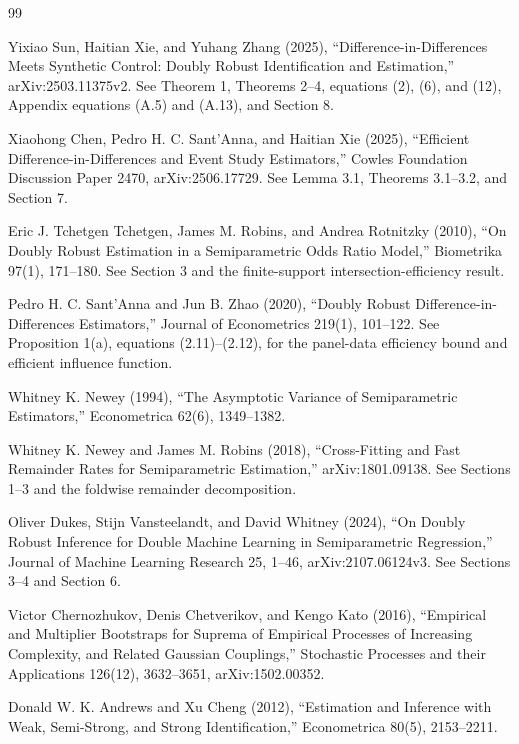 \documentclass{article}
\begin{document}
\begin{thebibliography}{99}

   Yixiao Sun, Haitian Xie, and Yuhang Zhang (2025), ``Difference-in-Differences Meets Synthetic Control: Doubly Robust Identification and Estimation,'' arXiv:2503.11375v2. See Theorem 1, Theorems 2--4, equations (2), (6), and (12), Appendix equations (A.5) and (A.13), and Section 8.

   Xiaohong Chen, Pedro H. C. Sant'Anna, and Haitian Xie (2025), ``Efficient Difference-in-Differences and Event Study Estimators,'' Cowles Foundation Discussion Paper 2470, arXiv:2506.17729. See Lemma 3.1, Theorems 3.1--3.2, and Section 7.

   Eric J. Tchetgen Tchetgen, James M. Robins, and Andrea Rotnitzky (2010), ``On Doubly Robust Estimation in a Semiparametric Odds Ratio Model,'' Biometrika 97(1), 171--180. See Section 3 and the finite-support intersection-efficiency result.

   Pedro H. C. Sant'Anna and Jun B. Zhao (2020), ``Doubly Robust Difference-in-Differences Estimators,'' Journal of Econometrics 219(1), 101--122. See Proposition 1(a), equations (2.11)--(2.12), for the panel-data efficiency bound and efficient influence function.

   Whitney K. Newey (1994), ``The Asymptotic Variance of Semiparametric Estimators,'' Econometrica 62(6), 1349--1382.

   Whitney K. Newey and James M. Robins (2018), ``Cross-Fitting and Fast Remainder Rates for Semiparametric Estimation,'' arXiv:1801.09138. See Sections 1--3 and the foldwise remainder decomposition.

   Oliver Dukes, Stijn Vansteelandt, and David Whitney (2024), ``On Doubly Robust Inference for Double Machine Learning in Semiparametric Regression,'' Journal of Machine Learning Research 25, 1--46, arXiv:2107.06124v3. See Sections 3--4 and Section 6.

   Victor Chernozhukov, Denis Chetverikov, and Kengo Kato (2016), ``Empirical and Multiplier Bootstraps for Suprema of Empirical Processes of Increasing Complexity, and Related Gaussian Couplings,'' Stochastic Processes and their Applications 126(12), 3632--3651, arXiv:1502.00352.

   Donald W. K. Andrews and Xu Cheng (2012), ``Estimation and Inference with Weak, Semi-Strong, and Strong Identification,'' Econometrica 80(5), 2153--2211.


\end{thebibliography}
\end{document}

